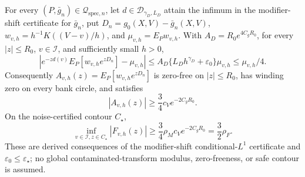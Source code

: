 For every \((P,\bar g_n)\in\mathcal Q_{\mathrm{spec},n}\), let \(d\in\mathcal D_{\gamma_D,L_D}\) attain the infimum in the modifier-shift certificate for \(\bar g_n\), put \(D_n=g_0(X,V)-\bar g_n(X,V)\), \(w_{v,h}=h^{-1}K((V-v)/h)\), and \(\mu_{v,h}=E_Pw_{v,h}\).  With \(A_D=R_0e^{4C_gR_0}\), for every \(|z|\le R_0\), \(v\in\mathcal I\), and sufficiently small \(h>0\),
\[
 \left|e^{-zd(v)}E_P[w_{v,h}e^{zD_n}]-\mu_{v,h}\right|
 \le A_D\{L_Dh^{\gamma_D}+\varepsilon_0\}\mu_{v,h}
 \le\mu_{v,h}/4.
\]
Consequently \(A_{v,h}(z)=E_P[w_{v,h}e^{zD_n}]\) is zero-free on \(|z|\le R_0\), has winding zero on every bank circle, and satisfies
\[
 |A_{v,h}(z)|\ge\frac34c_Ve^{-2C_gR_0}.
\]
On the noise-certified contour \(C_\star\),
\[
 \inf_{v\in\mathcal I,z\in C_\star}|F_{v,h}(z)|
 \ge\frac34\rho_Mc_Ve^{-2C_gR_0}=\frac32\rho_F.
\]
These are derived consequences of the modifier-shift conditional-\(L^1\) certificate and \(\varepsilon_0\le\varepsilon_\star\); no global contaminated-transform modulus, zero-freeness, or safe contour is assumed.